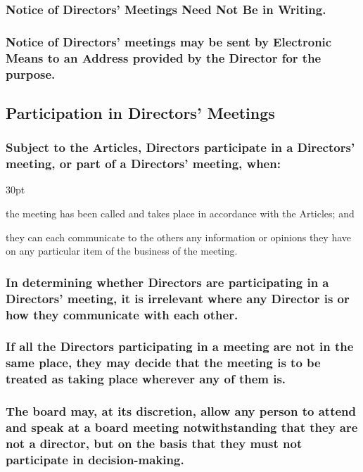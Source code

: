 \documentclass[12pt]{article}
\def\clauseindent{30pt}
\newenvironment{subindentpara}{\raggedright\begin{adjustwidth}{\clauseindent}{}\begin{hanginglist}}{\end{hanginglist}\end{adjustwidth}}
\begin{document}
\subsubsection{Notice of Directors' Meetings Need Not Be in Writing.}
\subsubsection[Notice of Directors' Meetings by Electronic Means]{Notice of Directors' meetings may be sent by Electronic Means to an Address provided by the Director for the purpose.}

\subsection{Participation in Directors' Meetings}\label{subsection:dirmeetspart}
\subsubsection[Specifics of Participation in Directors' Meetings]{Subject to the Articles, Directors participate in a Directors' meeting, or part of a Directors' meeting, when:}
\begin{subindentpara}
  \item the meeting has been called and takes place in accordance with the Articles; and
  \item they can each communicate to the others any information or opinions they have on any particular item of the business of the meeting.
\end{subindentpara}
\subsubsection[Location of Participation in Director's Meetings is Irrelevant]{In determining whether Directors are participating in a Directors' meeting, it is irrelevant where any Director is or how they communicate with each other.}
\subsubsection[Nominal Location of a Meeting is at Directors' Discretion]{If all the Directors participating in a meeting are not in the same place, they may decide that the meeting is to be treated as taking place wherever any of them is.}
\subsubsection[Directors' May Authorise Any Person to Speak at a Meeting]{The board may, at its discretion, allow any person to attend and speak at a board meeting notwithstanding that they are not a director, but on the basis that they must not participate in decision-making.}
\end{document}
